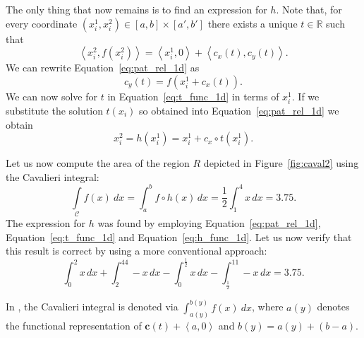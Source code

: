 \documentclass{article}
\theoremstyle{theorem}
\theoremstyle{definition}
\begin{document}
\noindent
The only thing that now remains is to find an expression for $h$. Note that, for every coordinate $(x_i^1,x_i^2) \in [a,b] \times [a',b']$ there exists a unique $t\in\mathbb{R}$ such that
\begin{equation}
 \label{eq:pat_rel_1d}
 \left <x_i^2,f(x_i^2) \right > = \left <x_i^1,0 \right> + \left<c_x(t),c_y(t) \right >.
 \end{equation}
 We can rewrite Equation~\eqref{eq:pat_rel_1d} as
 \begin{equation}
 \label{eq:t_func_1d}
 c_y(t) = f(x_i^1 + c_x(t)).
 \end{equation}
 We can now solve for $t$ in Equation~\eqref{eq:t_func_1d} in terms of $x_i^1$. If we substitute the solution $t(x_i)$ so obtained into Equation~\eqref{eq:pat_rel_1d} we obtain 
\begin{equation}
\label{eq:h_func_1d}
 x_i^2 = h(x_i^1) = x_i^1 + c_x\circ t(x_i^1).
\end{equation}

\noindent
Let us now compute the area of the region $R$ depicted in Figure~\ref{fig:caval2} using the Cavalieri integral:
\begin{equation}
\int \limits_{\mathcal{C}} f(x)~dx = \int_a^b f \circ h (x)\, dx = \dfrac{1}{2}\int_1^4x\, dx = 3.75. \nonumber 
\end{equation}
The expression for $h$ was found by employing Equation~\eqref{eq:pat_rel_1d}, Equation~\eqref{eq:t_func_1d} and Equation~\eqref{eq:h_func_1d}. Let us now verify that 
this result is correct by using a more conventional approach:
\begin{equation}
\int_0^2x\, dx+\int_2^44-x\, dx- \int_0^{\frac{1}{2}}x\, dx-\int_{\frac{1}{2}}^11-x\, dx = 3.75. \nonumber
\end{equation}

\noindent
In \cite{ackermann12}, the Cavalieri integral is denoted via $\int_{a(y)}^{b(y)} f(x)~dx$, where $a(y)$ denotes the functional representation of $\mathbf{c}(t) + \left <a,0 \right >$ and $b(y) = a(y)+(b-a)$. 

\end{document}
